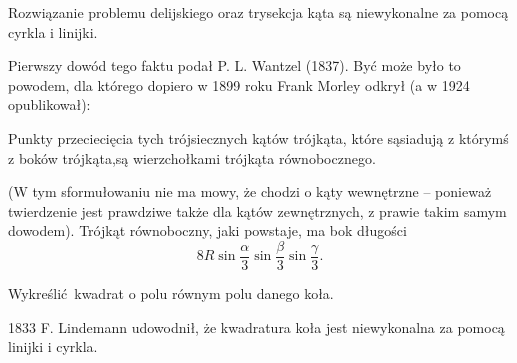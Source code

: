 \begin{proposition}
    Rozwiązanie problemu delijskiego oraz trysekcja kąta są niewykonalne za pomocą cyrkla i linijki.
\end{proposition}

Pierwszy dowód tego faktu podał P. L. Wantzel (1837).
Być może było to powodem, dla którego dopiero w 1899 roku Frank Morley odkrył (a w 1924 opublikował):

\begin{theorem}[Morleya]
    Punkty przeciecięcia tych trójsiecznych kątów trójkąta, które sąsiadują z którymś z boków trójkąta,są wierzchołkami trójkąta równobocznego.
\end{theorem}

(W tym sformułowaniu nie ma mowy, że chodzi o kąty wewnętrzne -- ponieważ twierdzenie jest prawdziwe także dla kątów zewnętrznych, z prawie takim samym dowodem).
Trójkąt równoboczny, jaki powstaje, ma bok długości
\begin{equation}
    8 R \sin \frac \alpha 3 \sin \frac \beta 3 \sin \frac \gamma 3.
\end{equation}

\begin{problem}
    Wykreślić kwadrat o polu równym polu danego koła.
\end{problem}

1833 F. Lindemann udowodnił, że kwadratura koła jest niewykonalna za pomocą linijki i cyrkla.




